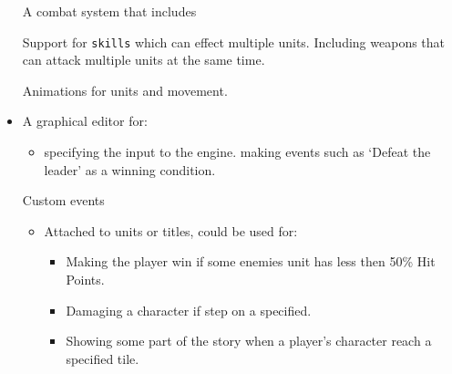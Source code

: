 \begin{itemize}
	
	\tick A combat system that includes 
	\begin{itemize}
		\tick Support for \texttt{skills} which can effect multiple units.
		\tick Including weapons that can attack multiple units at the same time. 
	\end{itemize}
	
	\tick Animations for units and movement.
	
	\item A graphical editor for:
	\begin{itemize}
		\tick   making custom maps.
		\tick   making animations.
		\tick   making items such as weapons.
		\tick   making skills. 
		\tick   making units.
		\item  specifying the input to the engine.
		\cross  making events such as `Defeat the leader' as a winning condition.
	\end{itemize}
	
	\cross Custom events
	\begin{itemize}
		\item Attached to units or titles, could be used for:
		\begin{itemize}
			\item Making the player win if some enemies unit has less then 50\% Hit Points.
			\item Damaging a character if step on a specified.
			\item Showing some part of the story when a player's character reach a specified tile.
		\end{itemize}
	\end{itemize}
	
\end{itemize}